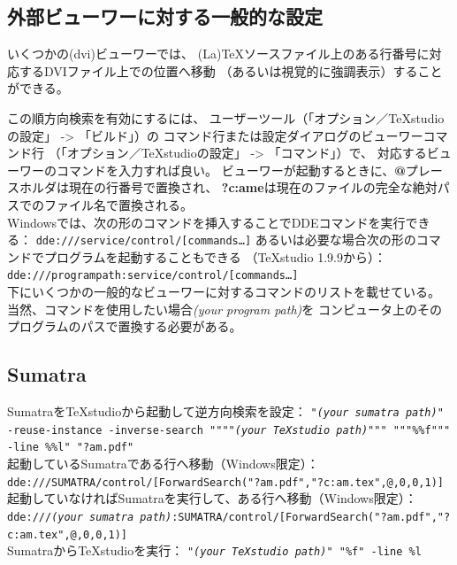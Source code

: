 \subsection{外部ビューワーに対する一般的な設定}

いくつかの(dvi)ビューワーでは、
(La)TeXソースファイル上のある行番号に対応するDVIファイル上での位置へ移動
（あるいは視覚的に強調表示）することができる。

この順方向検索を有効にするには、
ユーザーツール（「オプション／TeXstudioの設定」 -\textgreater{} 「ビルド」）の
コマンド行または設定ダイアログのビューワーコマンド行
（「オプション／TeXstudioの設定」 -\textgreater{} 「コマンド」）で、
対応するビューワーのコマンドを入力すれば良い。
ビューワーが起動するときに、\textbf{@}プレースホルダは現在の行番号で置換され、
\textbf{?c:ame}は現在のファイルの完全な絶対パスでのファイル名で置換される。\\


Windowsでは、次の形のコマンドを挿入することでDDEコマンドを実行できる：
\texttt{dde:///service/control/{[}commands\ldots{}{]}}
あるいは必要な場合次の形のコマンドでプログラムを起動することもできる
（TeXstudio 1.9.9から）：
\texttt{dde:///programpath:service/control/{[}commands\ldots{}{]}}\\


下にいくつかの一般的なビューワーに対するコマンドのリストを載せている。
当然、コマンドを使用したい場合\emph{(your program path)}を
コンピュータ上のそのプログラムのパスで置換する必要がある。

\subsection{Sumatra}

SumatraをTeXstudioから起動して逆方向検索を設定：
\texttt{"\emph{(your sumatra path)}" -reuse-instance -inverse-search
 """"\emph{(your TeXstudio path)}""" """\%\%f""" -line \%\%l" "?am.pdf"}\\


起動しているSumatraである行へ移動（Windows限定）：\\
\texttt{dde:///SUMATRA/control/{[}ForwardSearch("?am.pdf","?c:am.tex",@,0,0,1){]}}\\


起動していなければSumatraを実行して、ある行へ移動（Windows限定）：
\texttt{dde:///\emph{(your sumatra path)}:SUMATRA/control/{[}ForwardSearch("?am.pdf","?c:am.tex",@,0,0,1){]}}\\


SumatraからTeXstudioを実行： \texttt{"\emph{(your TeXstudio path)}" "\%f" -line \%l}\\


